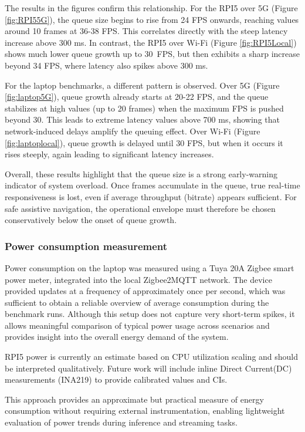 \documentclass{ieeeaccess}
\begin{document}
The results in the figures confirm this relationship. For the RPI5 over 5G (Figure \ref{fig:RPI55G}), the queue size begins to rise from 24 FPS onwards, reaching values around 10 frames at 36-38 FPS. This correlates directly with the steep latency increase above 300 ms. In contrast, the {RPI5 over Wi-Fi} (Figure \ref{fig:RPI5Local}) shows much lower queue growth up to 30~FPS, but then exhibits a sharp increase beyond 34 FPS, where latency also spikes above 300 ms.  

For the {laptop benchmarks}, a different pattern is observed. Over 5G (Figure \ref{fig:laptop5G}), queue growth already starts at 20-22 FPS, and the queue stabilizes at high values (up to 20 frames) when the maximum FPS is pushed beyond 30. This leads to extreme latency values above 700 ms, showing that network-induced delays amplify the queuing effect. Over Wi-Fi (Figure \ref{fig:laptoplocal}), queue growth is delayed until 30 FPS, but when it occurs it rises steeply, again leading to significant latency increases.  

Overall, these results highlight that the queue size is a strong early-warning indicator of system overload. Once frames accumulate in the queue, true real-time responsiveness is lost, even if average throughput (bitrate) appears sufficient. For safe assistive navigation, the operational envelope must therefore be chosen conservatively below the onset of queue growth.



\subsubsection*{Power consumption measurement}

Power consumption on the laptop was measured using a Tuya 20A Zigbee smart power meter, integrated into the local Zigbee2MQTT network. 
The device provided updates at a frequency of approximately once per second, which was sufficient to obtain a reliable overview of average consumption during the benchmark runs. 
Although this setup does not capture very short-term spikes, it allows meaningful comparison of typical power usage across scenarios and provides insight into the overall energy demand of the system.

RPI5 power is currently an estimate based on CPU utilization scaling and should be interpreted qualitatively. Future work will include inline Direct Current(DC) measurements (INA219) to provide calibrated values and CIs.

This approach provides an approximate but practical measure of energy consumption without requiring external instrumentation, enabling lightweight evaluation of power trends during inference and streaming tasks.
\end{document}
